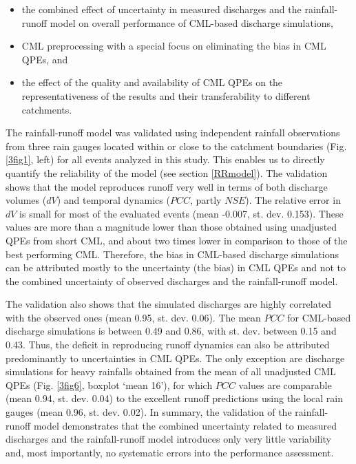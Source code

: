 \documentclass{ctuthesis}\usepackage[]{graphicx}\usepackage[]{color}
\begin{document}
\begin{samepage}
\begin{itemize}
\itemsep0em 
        \item the combined effect of uncertainty in measured discharges and the rainfall-runoff model on overall performance of CML-based discharge simulations, 
        \item CML preprocessing with a special focus on eliminating the bias in CML QPEs, and
        \item the effect of the quality and availability of CML QPEs on the representativeness of the results and their transferability to different catchments.
\end{itemize}
\end{samepage}

The rainfall-runoff model was validated using independent rainfall observations from three rain gauges located within or close to the catchment boundaries (Fig. \ref{3fig1}, left) for all events analyzed in this study. This enables us to directly quantify the reliability of the model (see section \ref{RRmodel}). The validation shows that the model reproduces runoff very well in terms of both discharge volumes ($dV$) and temporal dynamics ($PCC$, partly $NSE$). The relative error in $dV$ is small for most of the evaluated events (mean -0.007, st. dev. 0.153). These values are more than a magnitude lower than those obtained using unadjusted QPEs from short CML, and about two times lower in comparison to those of the best performing CML. Therefore, the bias in CML-based discharge simulations can be attributed mostly to the uncertainty (the bias) in CML QPEs and not to the combined uncertainty of observed discharges and the rainfall-runoff model. 

The validation also shows that the simulated discharges are highly correlated with the observed ones (mean 0.95, st. dev. 0.06). The mean $PCC$ for CML-based discharge simulations is between 0.49 and 0.86, with st. dev. between 0.15 and 0.43. Thus, the deficit in reproducing runoff dynamics can also be attributed predominantly to uncertainties in CML QPEs. The only exception are discharge simulations for heavy rainfalls obtained from the mean of all unadjusted CML QPEs (Fig. \ref{3fig6}, boxplot ‘mean 16’), for which $PCC$ values are comparable (mean 0.94, st. dev. 0.04) to the excellent runoff predictions using the local rain gauges (mean 0.96, st. dev. 0.02). In summary, the validation of the rainfall-runoff model demonstrates that the combined uncertainty related to measured discharges and the rainfall-runoff model introduces only very little variability and, most importantly, no systematic errors into the performance assessment.
\end{document}
